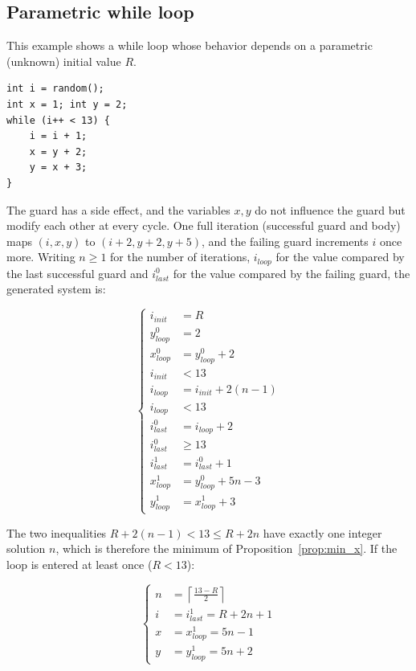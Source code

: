 \documentclass[oneside,english]{amsart}
\numberwithin{equation}{section}
\numberwithin{figure}{section}
\theoremstyle{plain}
\theoremstyle{definition}
\theoremstyle{plain}
\theoremstyle{remark}
\theoremstyle{plain}
\theoremstyle{definition}
\theoremstyle{plain}
\theoremstyle{remark}
\begin{document}
\subsection{Parametric while loop}

This example shows a while loop whose behavior depends on a parametric (unknown) initial value $R$.

\begin{lstlisting}
int i = random();
int x = 1; int y = 2;
while (i++ < 13) {
    i = i + 1;
    x = y + 2;
    y = x + 3;
}
\end{lstlisting}

The guard has a side effect, and the variables $x, y$ do not influence the guard but modify each other at every cycle. One full iteration (successful guard and body) maps $(i, x, y)$ to $(i + 2, y + 2, y + 5)$, and the failing guard increments $i$ once more. Writing $n \ge 1$ for the number of iterations, $i_{loop}$ for the value compared by the last successful guard and $i_{last}^{0}$ for the value compared by the failing guard, the generated system is:

\[
\begin{cases}
i_{init} & =R\\
y_{loop}^{0} & =2\\
x_{loop}^{0} & =y_{loop}^{0}+2\\
i_{init} & <13\\
i_{loop} & =i_{init}+2(n-1)\\
i_{loop} & <13\\
i_{last}^{0} & =i_{loop}+2\\
i_{last}^{0} & \geq13\\
i_{last}^{1} & =i_{last}^{0}+1\\
x_{loop}^{1} & =y_{loop}^{0}+5n-3\\
y_{loop}^{1} & =x_{loop}^{1}+3
\end{cases}
\]

The two inequalities $R + 2(n-1) < 13 \le R + 2n$ have exactly one integer solution $n$, which is therefore the minimum of Proposition~\ref{prop:min_x}. If the loop is entered at least once ($R<13$):

\[
\begin{cases}
n & =\left\lceil \frac{13-R}{2}\right\rceil \\
i & =i_{last}^{1}=R+2n+1\\
x & =x_{loop}^{1}=5n-1\\
y & =y_{loop}^{1}=5n+2
\end{cases}
\]
\end{document}
